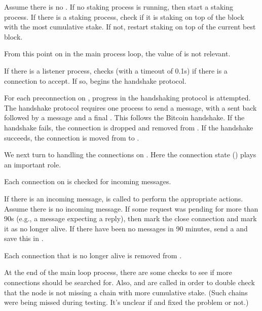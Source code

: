 Assume there is no {}.
If no staking process is running, then start a staking process.
If there is a staking process, check if it is staking on top of the block with the most
cumulative stake. If not, restart staking on top of the current best block.

From this point on in the main process loop, the value of {} is not relevant.

If there is a listener process, {} checks (with a timeout of 0.1s)
if there is a connection to accept. If so, {} begins the
handshake protocol.

For each preconnection on {}, progress in the handshaking protocol is attempted.
The handshake protocol requires one process to send a {} message,
with a {} sent back followed by a {} message
and a final {}. This follows the Bitcoin handshake.
If the handshake fails, the connection is dropped and removed from {}.
If the handshake succeeds, the connection is moved from {} to {}.

We next turn to handling the connections on {}.
Here the connection state ({}) plays an important role.

Each connection on {} is checked for incoming messages.

If there is an incoming message, {} is called to
perform the appropriate actions.
Assume there is no incoming message.
If some request was pending for more than 90s (e.g., a {} message
expecting a {} reply), then mark the close connection 
and mark it as no longer alive. If there have been no messages in 90 minutes,
send a {} and save this in {}.

Each connection that is no longer alive is removed from {}.

At the end of the main loop process, there are some checks to see if more connections should be searched
for. Also, {} and {}
are called in order to double check that the node is not missing a chain with more cumulative stake.
(Such chains were being missed during testing. It's unclear if 
{} and {} fixed the problem or not.)







